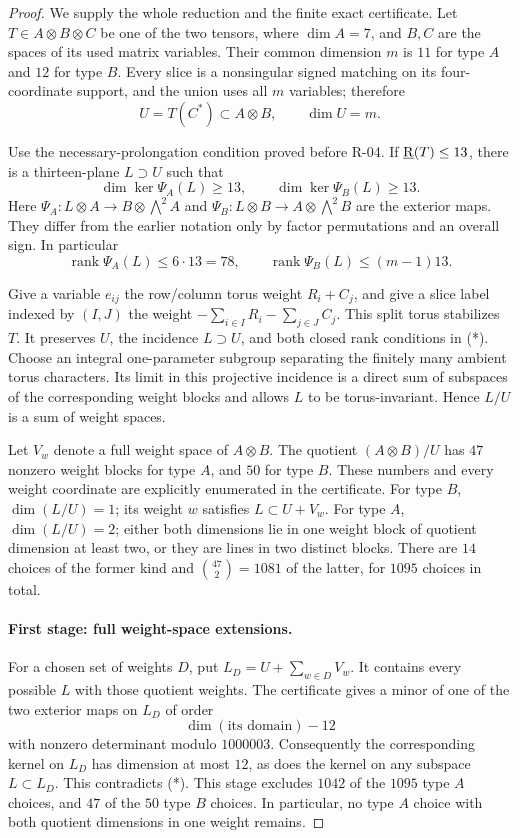 \begin{proof}
We supply the whole reduction and the finite exact certificate.
Let \(T\in A\otimes B\otimes C\) be one of the two tensors,
where \(\dim A=7\), and \(B,C\) are the spaces of its used
matrix variables. Their common dimension \(m\) is \(11\)
for type \(A\) and \(12\) for type \(B\). Every slice is a
nonsingular signed matching on its four-coordinate support,
and the union uses all \(m\) variables; therefore
\[
 U=T(C^*)\subset A\otimes B,\qquad \dim U=m.
\]

Use the necessary-prolongation condition proved before R-04.
If \(\underline{\mathrm R}(T)\leq13\), there is a thirteen-plane
\(L\supset U\) such that
\[
 \dim\ker\Psi_A(L)\geq13,\qquad
 \dim\ker\Psi_B(L)\geq13.
 \tag{*}
\]
Here \(\Psi_A:L\otimes A\to B\otimes\bigwedge^2A\) and
\(\Psi_B:L\otimes B\to A\otimes\bigwedge^2B\) are the
exterior maps. They differ from the earlier notation only
by factor permutations and an overall sign. In particular
\[
 \operatorname{rank}\Psi_A(L)\leq6\cdot13=78,\qquad
 \operatorname{rank}\Psi_B(L)\leq(m-1)13.
 \tag{**}
\]

Give a variable \(e_{ij}\) the row/column torus weight
\(R_i+C_j\), and give a slice label indexed by \((I,J)\)
the weight \(-\sum_{i\in I}R_i-\sum_{j\in J}C_j\).
This split torus stabilizes \(T\). It preserves \(U\), the
incidence \(L\supset U\), and both closed rank conditions
in (*). Choose an integral one-parameter subgroup separating the finitely
many ambient torus characters. Its limit in this projective incidence
is a direct sum of subspaces of the corresponding weight blocks and allows \(L\) to be torus-invariant. Hence \(L/U\) is a sum
of weight spaces.

Let \(V_w\) denote a full weight space of \(A\otimes B\).
The quotient \((A\otimes B)/U\) has \(47\) nonzero weight
blocks for type \(A\), and \(50\) for type \(B\).
These numbers and every weight coordinate are explicitly
enumerated in the certificate. For type \(B\),
\(\dim(L/U)=1\); its weight \(w\) satisfies
\(L\subset U+V_w\). For type \(A\),
\(\dim(L/U)=2\); either both dimensions lie in one weight
block of quotient dimension at least two, or they are
lines in two distinct blocks. There are \(14\) choices
of the former kind and \(\binom{47}{2}=1081\) of the
latter, for \(1095\) choices in total.

\paragraph{First stage: full weight-space extensions.}
For a chosen set of weights \(D\), put
\(L_D=U+\sum_{w\in D}V_w\). It contains every possible
\(L\) with those quotient weights. The certificate gives
a minor of one of the two exterior maps on \(L_D\)
of order
\[
 \dim(\text{its domain})-12
\]
with nonzero determinant modulo \(1000003\).
Consequently the corresponding kernel on \(L_D\) has
dimension at most \(12\), as does the kernel on any
subspace \(L\subset L_D\). This contradicts (*).
This stage excludes \(1042\) of the \(1095\) type \(A\)
choices, and \(47\) of the \(50\) type \(B\) choices.
In particular, no type \(A\) choice with both quotient
dimensions in one weight remains.


\end{proof}
